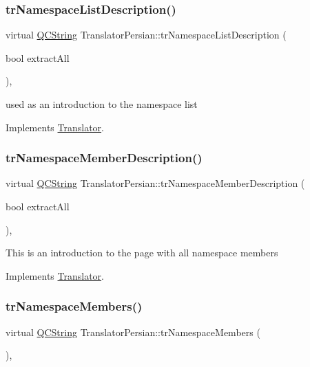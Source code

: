\subsubsection{\texorpdfstring{trNamespaceListDescription()}{trNamespaceListDescription()}}
{\footnotesize\ttfamily virtual \mbox{\hyperlink{class_q_c_string}{Q\+C\+String}} Translator\+Persian\+::tr\+Namespace\+List\+Description (\begin{DoxyParamCaption}\item[{bool}]{extract\+All }\end{DoxyParamCaption})\hspace{0.3cm}{\ttfamily [inline]}, {\ttfamily [virtual]}}

used as an introduction to the namespace list 

Implements \mbox{\hyperlink{class_translator}{Translator}}.

\mbox{\label{class_translator_persian_aacd921c664d9b611943e1fb8ee5a3fed}} 
\subsubsection{\texorpdfstring{trNamespaceMemberDescription()}{trNamespaceMemberDescription()}}
{\footnotesize\ttfamily virtual \mbox{\hyperlink{class_q_c_string}{Q\+C\+String}} Translator\+Persian\+::tr\+Namespace\+Member\+Description (\begin{DoxyParamCaption}\item[{bool}]{extract\+All }\end{DoxyParamCaption})\hspace{0.3cm}{\ttfamily [inline]}, {\ttfamily [virtual]}}

This is an introduction to the page with all namespace members 

Implements \mbox{\hyperlink{class_translator}{Translator}}.

\mbox{\label{class_translator_persian_a6d2cec6e6b01c46c98f3ae04c11e8ebf}} 
\subsubsection{\texorpdfstring{trNamespaceMembers()}{trNamespaceMembers()}}
{\footnotesize\ttfamily virtual \mbox{\hyperlink{class_q_c_string}{Q\+C\+String}} Translator\+Persian\+::tr\+Namespace\+Members (\begin{DoxyParamCaption}{ }\end{DoxyParamCaption})\hspace{0.3cm}{\ttfamily [inline]}, {\ttfamily [virtual]}}

